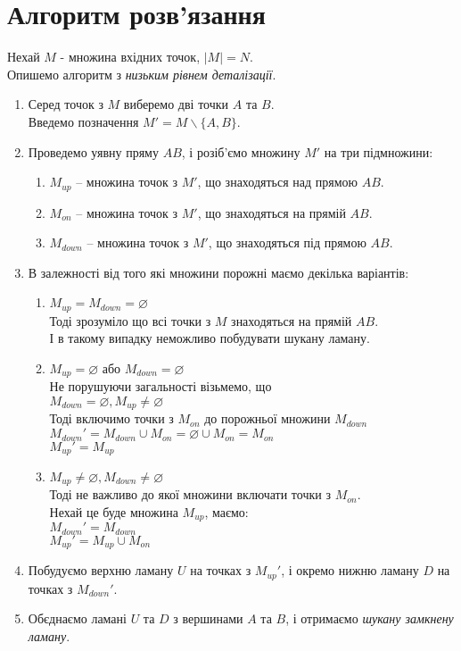 \documentclass[a4paper,12pt,titlepage]{article}
\begin{document}
%
%

\section{Алгоритм розв'язання}

Нехай $M$ - множина вхідних точок, $|M| = N$.\\
Опишемо алгоритм з \emph{низьким рівнем деталізації}.
\begin{enumerate}
	\item{
		Серед точок з $M$ виберемо дві точки $A$ та $B$.\\
		Введемо позначення $M' = M \backslash \{ A, B \}$.
	}
	\item{
		Проведемо уявну пряму $AB$, і розіб'ємо множину $M'$ на три підмножини:
		\begin{enumerate}
			\item{
				$M_{up}$ -- множина точок з $M'$, що знаходяться над прямою $AB$.
			}
			\item{
				$M_{on}$ -- множина точок з $M'$, що знаходяться на прямій $AB$.
			}
			\item{
				$M_{down}$ -- множина точок з $M'$, що знаходяться під прямою $AB$.
			}
		\end{enumerate}	
	}
	\item{
		В залежності від того які множини порожні маємо декілька варіантів:
		\begin{enumerate}
			\item{
				$M_{up} = M_{down} = \varnothing$\\
				Тоді зрозуміло що всі точки з $M$ знаходяться на прямій $AB$.\\
				І в такому випадку неможливо побудувати шукану ламану.
			}
			\item{
				$M_{up} = \varnothing$ або $M_{down} = \varnothing$\\
				Не порушуючи загальності візьмемо, що\\
				$M_{down} = \varnothing, M_{up} \neq \varnothing$\\
				Тоді включимо точки з $M_{on}$ до порожньої множини $M_{down}$\\
				$M_{down}' = M_{down} \cup M_{on} = \varnothing \cup M_{on} = M_{on}$\\
		    	$M_{up}' = M_{up}$
			}
			\item{
				$M_{up} \neq \varnothing, M_{down} \neq \varnothing$\\
				Тоді не важливо до якої множини включати точки з $M_{on}$.\\
		   	    Нехай це буде множина $M_{up}$, маємо:\\
		   	    $M_{down}' = M_{down}$\\
		   	    $M_{up}' = M_{up} \cup M_{on}$
			}
		\end{enumerate}
	}
	\item{
		Побудуємо верхню ламану $U$ на точках з $M_{up}'$, і окремо нижню ламану $D$ на точках з $M_{down}'$.
	}
	\item{
		Обєднаємо ламані $U$ та $D$ з вершинами $A$ та $B$, і отримаємо \emph{шукану замкнену ламану}.
	}
\end{enumerate}
\end{document}
